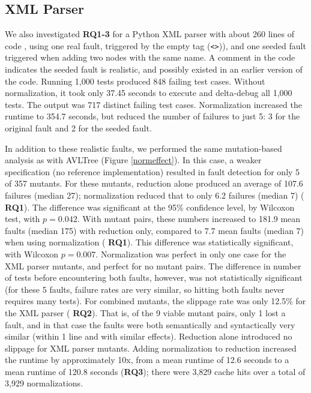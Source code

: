 \subsection{XML Parser}

We also investigated {\bf RQ1-3} for a
Python XML parser with about 260 lines of code \cite{myxml}, using one
real fault, triggered by the empty tag ({\tt <>})), and one
seeded fault triggered when adding two nodes with the same
name.  A comment in the code indicates the seeded fault is realistic,
and possibly existed in an earlier version of the code.  Running 1,000 tests
produced 848 failing test cases.  Without normalization, it took only
37.45 seconds to execute and delta-debug all 1,000 tests.  The output was 717 distinct failing test
cases.  Normalization increased the runtime to 354.7 seconds, but
reduced the number of failures to just 5: 3 
for the original fault and 2 for the seeded fault.

In addition to these realistic faults, we performed the same
mutation-based analysis as with AVLTree (Figure \ref{normeffect}). In
this case, a weaker specification (no reference implementation)
resulted in fault detection for only 5 of 357 mutants.  For these
mutants, reduction alone produced an average of 107.6 failures (median
27); normalization reduced that to only 6.2 failures (median 7) ({\bf
  RQ1}).  The difference was significant at the 95\% confidence level,
by Wilcoxon test, with $p=0.042$.  With mutant pairs, these numbers
increased to 181.9 mean faults (median 175) with reduction only,
compared to 7.7 mean faults (median 7) when using normalization ({\bf
  RQ1}).  This difference was statistically significant, with Wilcoxon
$p=0.007$.  Normalization was perfect in only one case for
the XML parser mutants, and perfect for no mutant pairs.  The
difference in number of tests before encountering both faults,
however, was not statistically significant (for these 5 faults,
failure rates are very similar, so hitting both faults never requires
many tests).  For combined
mutants, the slippage rate was only 12.5\% for the XML parser ({\bf
  RQ2}).  That is, of the 9 viable mutant pairs, only 1 lost a fault,
and in that case the faults were both semantically and syntactically
very similar (within 1 line and with similar effects).  Reduction alone introduced no slippage for XML parser
mutants.  Adding normalization to reduction increased the runtime by
approximately 10x, from a mean runtime of 12.6 seconds to a mean
runtime of 120.8 seconds ({\bf RQ3}); there were 3,829 cache hits over
a total of 3,929 normalizations.

